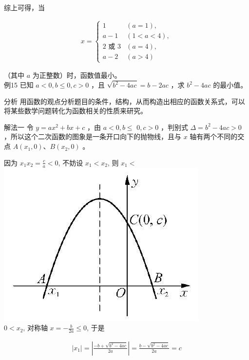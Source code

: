 \documentclass[10pt]{article}
\begin{document}
综上可得，当

\begin{align*}
x= \begin{cases}1 & (a=1), \\ a-1 & (1<a<4), \\ 2 \text { 或 } 3 & (a=4), \\ a-2 & (a>4)\end{cases}
\end{align*}

（其中 $a$ 为正整数）时，函数值最小。\\
例15 已知 $a<0, b \leqslant 0, c>0$ ，且 $\sqrt{b^{2}-4 a c}=b-2 a c$ ，求 $b^{2}-4 a c$ 的最小值。

分析 用函数的观点分析题目的条件，结构，从而构造出相应的函数关系式，可以将某些数学问题转化为函数相关的性质来研究。

解法一 令 $y=a x^{2}+b x+c$ ，由 $a<0, b \leqslant$ $0, c>0$ ，判别式 $\Delta=b^{2}-4 a c>0$ ，所以这个二次函数的图象是一条开口向下的抛物线，且与 $x$ 轴有两个不同的交点 $A\left(x_{1}, 0\right) 、 B\left(x_{2}, 0\right)$ 。

因为 $x_{1} x_{2}=\frac{c}{a}<0$, 不妨设 $x_{1}<x_{2}$, 则 $x_{1}<$\\
\includegraphics[max width=\textwidth, center]{2024_10_30_1bf34f7aeb61f11d11d3g-078}\\
$0<x_{2}$, 对称轴 $x=-\frac{b}{2 a} \leqslant 0$, 于是

\begin{align*}
\left|x_{1}\right|=\left|\frac{-b+\sqrt{b^{2}-4 a c}}{2 a}\right|=\frac{b-\sqrt{b^{2}-4 a c}}{2 a}=c
\end{align*}
\end{document}
